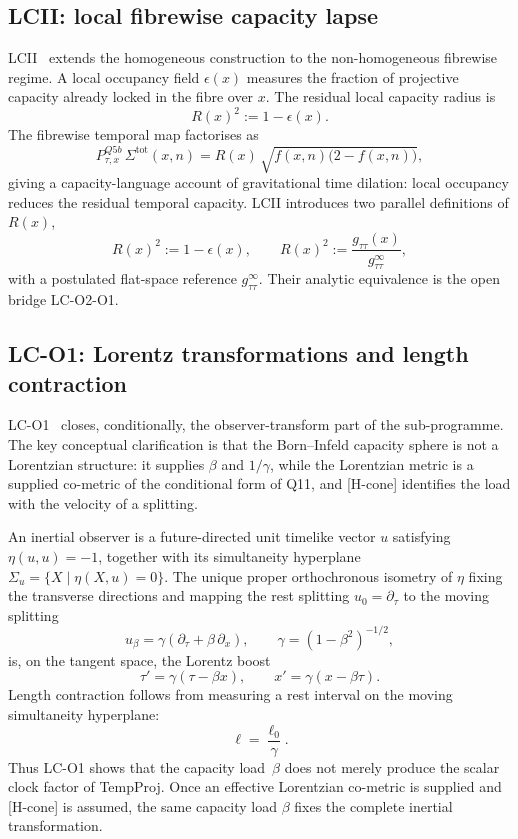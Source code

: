 \documentclass[12pt,a4paper]{article}
\theoremstyle{remark}
\begin{document}
  \subsection{LCII: local fibrewise capacity lapse~\texorpdfstring{\cite{Beau2026lco2}}{}}
    \label{subsec:lcii}

    LCII~\cite{Beau2026lco2} extends the homogeneous construction to the non-homogeneous
    fibrewise regime.
    A local occupancy field $\epsilon(x)$ measures the fraction of projective capacity already
    locked in the fibre over $x$.
    The residual local capacity radius is
    \[
      R(x)^2 := 1-\epsilon(x).
    \]
    The fibrewise temporal map factorises as
    \[
      P^{Q5b}_{\tau,x}\,\Sigma^{\mathrm{tot}}(x,n)
      = R(x)\,\sqrt{f(x,n)\bigl(2-f(x,n)\bigr)},
    \]
    giving a capacity-language account of gravitational time dilation: local occupancy reduces
    the residual temporal capacity.
    LCII introduces two parallel definitions of $R(x)$,
    \[
      R(x)^2 := 1-\epsilon(x), \qquad R(x)^2 := \frac{g_{\tau\tau}(x)}{g_{\tau\tau}^\infty},
    \]
    with a postulated flat-space reference $g_{\tau\tau}^\infty$.
    Their analytic equivalence is the open bridge LC-O2-O1.

  \subsection{LC-O1: Lorentz transformations and length contraction~\texorpdfstring{\cite{Beau2026lco1}}{}}
    \label{subsec:lco1}

    LC-O1~\cite{Beau2026lco1} closes, conditionally, the observer-transform part of the sub-programme.
    The key conceptual clarification is that the Born--Infeld capacity sphere is not a
    Lorentzian structure: it supplies $\beta$ and $1/\gamma$, while the Lorentzian metric is
    a supplied co-metric of the conditional form of Q11, and [H-cone] identifies the load with the velocity of a
    splitting.

    An inertial observer is a future-directed unit timelike vector $u$ satisfying $\eta(u,u) =
  -1$, together with its simultaneity hyperplane $\Sigma_u = \{X \mid \eta(X,u) = 0\}$.
    The unique proper orthochronous isometry of $\eta$ fixing the transverse directions and mapping the rest
    splitting $u_0 = \partial_\tau$ to the moving splitting
    \[
      u_\beta = \gamma(\partial_\tau + \beta\,\partial_x), \qquad \gamma = (1-\beta^2)^{-1/2},
    \]
    is, on the tangent space, the Lorentz boost
    \[
      \tau' = \gamma(\tau - \beta x), \qquad x' = \gamma(x - \beta\tau).
    \]
    Length contraction follows from measuring a rest interval on the moving simultaneity
    hyperplane:
    \[
      \ell = \frac{\ell_0}{\gamma}.
    \]
    Thus LC-O1 shows that the capacity load~$\beta$ does not merely produce the scalar clock
    factor of TempProj.
    Once an effective Lorentzian co-metric is supplied and [H-cone] is assumed, the same capacity load $\beta$
    fixes the complete inertial transformation.
\end{document}

